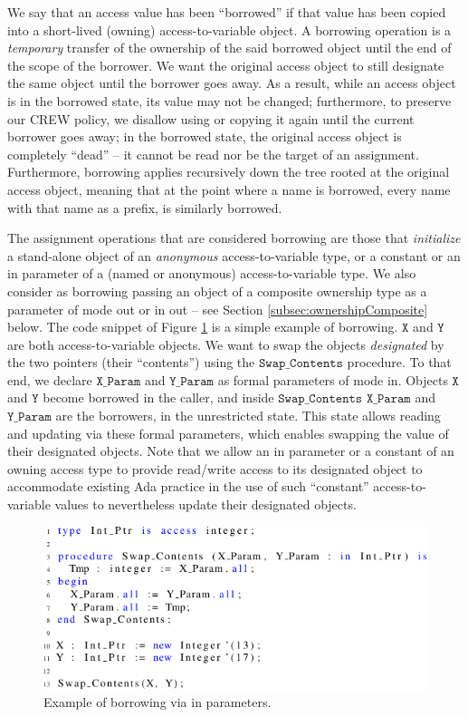 \documentclass[runningheads]{llncs}
\newcommand\var[1]{\ensuremath{\mathtt{#1}}}
\newcommand{\keyword}[1]{\textsf{#1}}
\begin{document}
We say that an access value has been ``borrowed'' if that value has been copied into a short-lived (owning) access-to-variable object.
A borrowing operation is a \textit{temporary} transfer of the ownership of the said borrowed object until the end of the scope of the borrower.
We want the original access object to still designate the same object until the borrower goes away. As a result, while an access object
is in the borrowed state, its value may not be changed; furthermore, to preserve our CREW policy, we disallow using or copying it again until the current borrower goes away; in the borrowed state, the original access object is completely ``dead'' -- it cannot
be read nor be the target of an assignment. Furthermore, borrowing applies recursively down the tree rooted at the original access object, meaning that at the point where a name is borrowed,
every name with that name as a prefix, is similarly borrowed.


The assignment operations that are considered borrowing are those that \textit{initialize} a stand-alone object of an \textit{anonymous} access-to-variable type, or a \keyword{constant} or an \keyword{in} parameter of a (named or anonymous) access-to-variable
type.  We also consider as borrowing passing an object of a composite ownership type
as a parameter of mode \keyword{out} or \keyword{in out} -- see Section \ref{subsec:ownershipComposite} below. The code snippet of Figure \ref{fig:borrow_ex1} is a simple example of borrowing. \var{X} and \var{Y} are both access-to-variable objects. We want to swap the objects \textit{designated} by the two
pointers (their ``contents'') using the \var{Swap\_Contents} procedure. To that end, we declare \var{X\_Param} and \var{Y\_Param} as formal parameters of mode \keyword{in}. Objects \var{X} and \var{Y} become borrowed
in the caller, and inside \var{Swap\_Contents} \var{X\_Param} and \var{Y\_Param} are the borrowers, in the unrestricted state. This state allows reading and updating via these formal parameters, which enables swapping
the value of their designated objects. Note that we allow an \keyword{in} parameter or a constant of an owning access type to provide read/write access to its designated object to accommodate existing Ada practice in the use of such ``constant'' access-to-variable values to nevertheless update their designated objects.

\begin{figure}[htb!]
\centering
   \includegraphics[]{borrow_ex1}
   \caption{Example of borrowing via \keyword{in} parameters.}
   \label{fig:borrow_ex1}
\end{figure}
\end{document}
